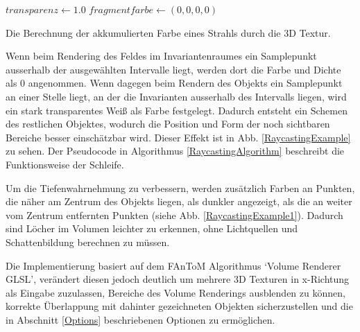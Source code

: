 \documentclass[a4paper,fontsize=12pt,toc=bib,halfparskip]{scrartcl}
\begin{document}
\begin{algorithm}[t]
	$transparenz\gets 1.0$\;
	$fragmentfarbe\gets (0, 0, 0, 0)$\;
	\vspace{0.5cm}
	\caption{Die Berechnung der akkumulierten Farbe eines Strahls durch die 3D Textur.}
	\label{RaycastingAlgorithm}
\end{algorithm}

Wenn beim Rendering des Feldes im Invariantenraumes ein Samplepunkt ausserhalb der ausgew\"ahlten Intervalle liegt, werden dort die Farbe und Dichte als 0 angenommen. Wenn dagegen beim Rendern des Objekts ein Samplepunkt an einer Stelle liegt, an der die Invarianten ausserhalb des Intervalls liegen, wird ein stark transparentes Wei{\ss} als Farbe festgelegt. Dadurch entsteht ein Schemen des restlichen Objektes, wodurch die Position und Form der noch sichtbaren Bereiche besser einsch\"atzbar wird. Dieser Effekt ist in Abb. \ref{RaycastingExample} zu sehen. Der Pseudocode in Algorithmus \ref{RaycastingAlgorithm} beschreibt die Funktionsweise der Schleife.

Um die Tiefenwahrnehmung zu verbessern, werden zus\"atzlich Farben an Punkten, die n\"aher am Zentrum des Objekts liegen, als dunkler angezeigt, als die an weiter vom Zentrum entfernten Punkten (siehe Abb. \ref{RaycastingExample1}). Dadurch sind L\"ocher im Volumen leichter zu erkennen, ohne Lichtquellen und Schattenbildung berechnen zu m\"ussen.

Die Implementierung basiert auf dem FAnToM Algorithmus `Volume Renderer GLSL', ver\"andert diesen jedoch deutlich um mehrere 3D Texturen in x-Richtung als Eingabe zuzulassen, Bereiche des Volume Renderings ausblenden zu k\"onnen, korrekte \"Uberlappung mit dahinter gezeichneten Objekten sicherzustellen und die in Abschnitt \ref{Options} beschriebenen Optionen zu erm\"oglichen.
\end{document}
